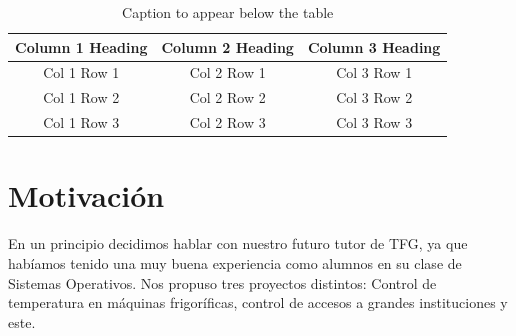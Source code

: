 \begin{table}

    \begin{center}


    \begin{tabular}[c]{|c|c|c|}
        \hline
        Column 1 Heading & Column 2 Heading & Column 3 Heading \\
        \hline
        Col 1 Row 1 & Col 2 Row 1 & Col 3 Row 1\\
        Col 1 Row 2 & Col 2 Row 2 & Col 3 Row 2\\
        Col 1 Row 3 & Col 2 Row 3 & Col 3 Row 3\\
        \hline
    \end{tabular}
    \caption{Caption to appear below the table}
    \label{table1}
   \end{center}
\end{table}

\section{Motivación}
\label{makereference1.1}

En un principio decidimos hablar con nuestro futuro tutor de TFG, ya que habíamos tenido una muy buena experiencia como alumnos en su clase de Sistemas Operativos.
Nos propuso tres proyectos distintos: Control de temperatura en máquinas frigoríficas, control de accesos a grandes instituciones y este.


